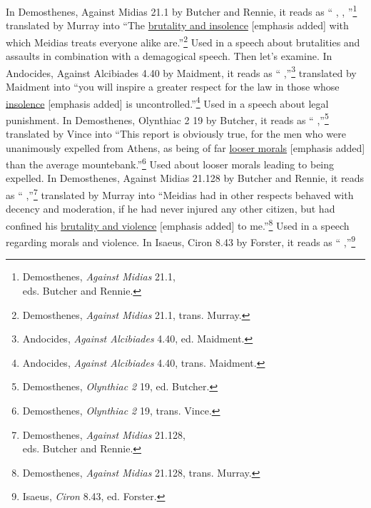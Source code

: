 In Demosthenes, Against Midias 21.1 by Butcher and Rennie, it reads as `` \underline{}, , ''\footnote{Demosthenes, \emph{Against Midias} 21.1,\\eds. Butcher and Rennie.}
translated by Murray into ``The \underline{brutality and insolence} [emphasis added] with which Meidias treats everyone alike are.''\footnote{Demosthenes, \emph{Against Midias} 21.1, trans. Murray.} Used in a speech about brutalities and assaults in combination with a demagogical speech. 
Then let's examine.
In Andocides, Against Alcibiades 4.40 by Maidment, it reads as `` \underline{} ,''\footnote{Andocides, \emph{Against Alcibiades} 4.40, ed. Maidment.}
translated by Maidment into ``you will inspire a greater respect for the law in those whose \underline{insolence} [emphasis added] is uncontrolled.''\footnote{Andocides, \emph{Against Alcibiades} 4.40, trans. Maidment.} Used in a speech about legal punishment. 
In Demosthenes, Olynthiac 2 19 by Butcher, it reads as `` \underline{} ,''\footnote{Demosthenes, \emph{Olynthiac 2} 19, ed. Butcher.}
translated by Vince into ``This report is obviously true, for the men who were unanimously expelled from Athens, as being of far \underline{looser morals} [emphasis added] than the average mountebank.''\footnote{Demosthenes, \emph{Olynthiac 2} 19, trans. Vince.} Used about looser morals leading to being expelled. 
In Demosthenes, Against Midias 21.128 by Butcher and Rennie, it reads as `` \underline{} ,''\footnote{Demosthenes, \emph{Against Midias} 21.128,\\eds. Butcher and Rennie.}
translated by Murray into ``Meidias had in other respects behaved with decency and moderation, if he had never injured any other citizen, but had confined his \underline{brutality and violence} [emphasis added] to me.''\footnote{Demosthenes, \emph{Against Midias} 21.128, trans. Murray.} Used in a speech regarding morals and violence.
In Isaeus, Ciron 8.43 by Forster, it reads as `` \underline{} ,''\footnote{Isaeus, \emph{Ciron} 8.43, ed. Forster.} 
